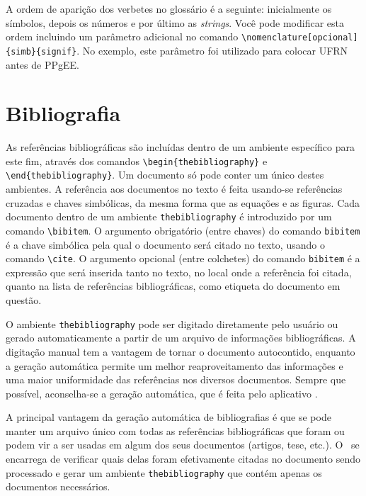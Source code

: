 A ordem de aparição dos verbetes no glossário é a seguinte:
inicialmente os símbolos, depois os números e por último as
\textit{strings}. Você pode modificar esta ordem incluindo um
parâmetro adicional no comando
\verb|\nomenclature[opcional]{simb}{signif}|. No exemplo, este
parâmetro foi utilizado para colocar UFRN antes de PPgEE.

\section{Bibliografia}
\label{Sec:citacoes}

As referências bibliográficas são incluídas dentro de um ambiente
específico para este fim, através dos comandos
\verb|\begin{thebibliography}| e \verb|\end{thebibliography}|. Um
documento só pode conter um único destes ambientes. A referência aos
documentos no texto é feita usando-se referências cruzadas e chaves
simbólicas, da mesma forma que as equações e as figuras. Cada
documento dentro de um ambiente \texttt{thebibliography} é introduzido
por um comando \verb|\bibitem|. O argumento obrigatório (entre chaves)
do comando \texttt{bibitem} é a chave simbólica pela qual o documento
será citado no texto, usando o comando \verb|\cite|.  O argumento
opcional (entre colchetes) do comando \texttt{bibitem} é a expressão
que será inserida tanto no texto, no local onde a referência foi
citada, quanto na lista de referências bibliográficas, como etiqueta
do documento em questão.

O ambiente \texttt{thebibliography} pode ser digitado diretamente pelo
usuário ou gerado automaticamente a partir de um arquivo de
informações bibliográficas. A digitação manual tem a vantagem de
tornar o documento autocontido, enquanto a geração automática permite
um melhor reaproveitamento das informações e uma maior uniformidade
das referências nos diversos documentos. Sempre que possível,
aconselha-se a geração automática, que é feita pelo aplicativo
\BibTeX.

A principal vantagem da geração automática de bibliografias é que se
pode manter um arquivo único com todas as referências bibliográficas
que foram ou podem vir a ser usadas em algum dos seus documentos
(artigos, tese, etc.).  O \BibTeX\ se encarrega de verificar quais
delas foram efetivamente citadas no documento sendo processado e gerar
um ambiente \texttt{thebibliography} que contém apenas os documentos
necessários.

